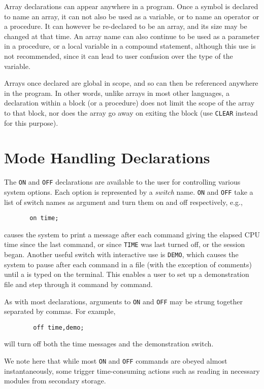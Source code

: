 Array declarations can appear anywhere in a program. Once a symbol is
declared to name an array, it can not also be used as a variable, or to
name an operator or a procedure. It can however be re-declared to be an
array, and its size may be changed at that time. An array name can also
continue to be used as a parameter in a procedure, or a local variable in
a compound statement, although this use is not recommended, since it can
lead to user confusion over the type of the variable.

Arrays once declared are global in scope, and so can then be referenced
anywhere in the program. In other words, unlike arrays in most other
languages, a declaration within a block (or a procedure) does not limit
the scope of the array to that block, nor does the array go away on
exiting the block (use {\tt CLEAR} instead for this purpose).

\section{Mode Handling Declarations}

The {\tt ON} and {\tt OFF} declarations are
available to the user for controlling various system options.  Each option
is represented by a {\em switch\/} name. {\tt ON} and {\tt OFF}
take a list of switch names as argument and turn them on and off
respectively, e.g.,
\begin{verbatim}
       on time;
\end{verbatim}
causes the system to print a message after each command giving the elapsed
CPU time since the last command, or since {\tt TIME} was
last turned off, or the session began.  Another useful switch with
interactive use is {\tt DEMO}, which causes the system to
pause after each command in a file (with the exception of comments)
until a  is typed on the terminal.  This
enables a user to set up a demonstration file and step through it command
by command.

As with most declarations, arguments to {\tt ON} and {\tt OFF} may be
strung together separated by commas.  For example,
\begin{verbatim}
        off time,demo;
\end{verbatim}
will turn off both the time messages and the demonstration switch.

We note here that while most {\tt ON} and {\tt OFF} commands are obeyed
almost instantaneously, some trigger time-consuming actions such as
reading in necessary modules from secondary storage.

